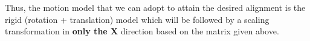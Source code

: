 \documentclass{article}
\begin{document}
Thus, the motion model that we can adopt to attain the desired alignment is the rigid (rotation + translation) model which will be followed by a scaling transformation in {\bf only the X} direction based on the matrix given above.






\end{document}
